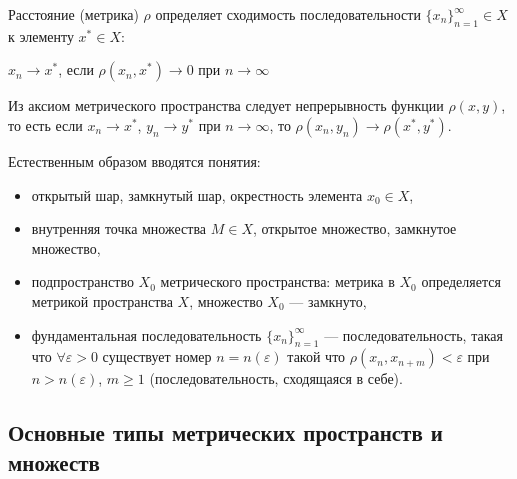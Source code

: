 \documentclass[12pt,a4paper,titlepage, oneside]{book}
\theoremstyle{definition}
\theoremstyle{plain}
\theoremstyle{remark}
\theoremstyle{remark}
\theoremstyle{remark}
\theoremstyle{remark}
\theoremstyle{plain}
\theoremstyle{plain}
\begin{document}
Расстояние (метрика) $\rho$ определяет сходимость последовательности $\lbrace x_n \rbrace_{n=1}^{\infty} \in X$ к элементу $x^{*} \in X$:

\begin{center}

$x_n\to x^*$, если $\rho(x_n, x^{*})\to 0$ при $n\to\infty$

\end{center}

Из аксиом метрического пространства следует непрерывность функции $\rho(x, y)$, то есть если $x_n\to x^{*}$, $y_n\to y^{*}$ при $n \to \infty$, то $\rho(x_n, y_n) \to \rho(x^*, y^*)$.

Естественным образом вводятся понятия:

\begin{itemize}

	\item  открытый шар, замкнутый шар, окрестность элемента $x_0\in X$,

	\item внутренняя точка множества $M \in X$, открытое множество, замкнутое множество,

	\item подпространство $X_0$ метрического пространства: метрика в $X_0$ определяется метрикой пространства $X$, множество $X_0$ --- замкнуто,

	\item фундаментальная последовательность $\lbrace x_n \rbrace_{n=1}^{\infty}$ --- последовательность, такая что $\forall \varepsilon > 0$ существует номер $n = n(\varepsilon)$ такой что $\rho(x_n, x_{n+m}) < \varepsilon$ при $n > n(\varepsilon)$, $m \geq 1$ (последовательность, сходящаяся в себе).

\end{itemize}

\subsection*{Основные типы метрических пространств и множеств}
\end{document}
